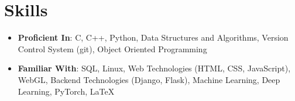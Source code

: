 \documentclass[letterpaper,11pt]{article}
\newcommand{\resumeSubHeadingListStart}{\begin{itemize}[leftmargin=*]}
\newcommand{\resumeSubHeadingListEnd}{\end{itemize}}
\newcommand{\resumeItemListStart}{\begin{itemize}}
\newcommand{\resumeItemListEnd}{\end{itemize}\vspace{-5pt}}
\begin{document}
\section{Skills}
 \resumeSubHeadingListStart
    \setlength{\itemsep}{1pt}
     \item\textbf{Proficient In}{: C, C++, Python, Data Structures and Algorithms, Version Control System (git), Object Oriented Programming}\\
     \item\textbf{Familiar With}{: SQL, Linux, Web Technologies (HTML, CSS, JavaScript), WebGL, Backend Technologies (Django, Flask), Machine Learning, Deep Learning, PyTorch, \LaTeX}
 \resumeSubHeadingListEnd
 
\end{document}
